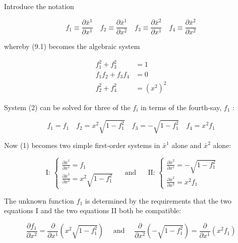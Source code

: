 \documentclass[10pt]{article}
\begin{document}
Introduce the notation


\begin{equation*}
f_{1} \equiv \frac{\partial \bar{x}^{1}}{\partial x^{1}} \quad f_{2} \equiv \frac{\partial \bar{x}^{1}}{\partial x^{2}} \quad f_{3} \equiv \frac{\partial \bar{x}^{2}}{\partial x^{1}} \quad f_{4} \equiv \frac{\partial \bar{x}^{2}}{\partial x^{2}} \tag{1}
\end{equation*}


whereby (9.1) becomes the algebraic system


\begin{align*}
f_{1}^{2}+f_{3}^{2} & =1 \\
f_{1} f_{2}+f_{3} f_{4} & =0  \tag{2}\\
f_{2}^{2}+f_{4}^{2} & =\left(x^{2}\right)^{2}
\end{align*}


System (2) can be solved for three of the $f_{i}$ in terms of the fourth-say, $f_{1}$ :


\begin{equation*}
f_{1}=f_{1} \quad f_{2}=x^{2} \sqrt{1-f_{1}^{2}} \quad f_{3}=-\sqrt{1-f_{1}^{2}} \quad f_{4}=x^{2} f_{1} \tag{3}
\end{equation*}


Now (1) becomes two simple first-order systems in $\bar{x}^{1}$ alone and $\bar{x}^{2}$ alone:

$$
\text { I: }\left\{\begin{array} { l } 
{ \frac { \partial \overline { x } ^ { 1 } } { \partial x ^ { 1 } } = f _ { 1 } } \\
{ \frac { \partial \overline { x } ^ { 1 } } { \partial x ^ { 2 } } = x ^ { 2 } \sqrt { 1 - f _ { 1 } ^ { 2 } } }
\end{array} \quad \text { and } \quad \text { II: } \left\{\begin{array}{l}
\frac{\partial \bar{x}^{2}}{\partial x^{1}}=-\sqrt{1-f_{1}^{2}} \\
\frac{\partial \bar{x}^{2}}{\partial x^{2}}=x^{2} f_{1}
\end{array}\right.\right.
$$

The unknown function $f_{1}$ is determined by the requirements that the two equations I and the two equations II both be compatible:

$$
\frac{\partial f_{1}}{\partial x^{2}}=\frac{\partial}{\partial x^{1}}\left(x^{2} \sqrt{1-f_{1}^{2}}\right) \quad \text { and } \quad \frac{\partial}{\partial x^{2}}\left(-\sqrt{1-f_{1}^{2}}\right)=\frac{\partial}{\partial x^{1}}\left(x^{2} f_{1}\right)
$$
\end{document}
